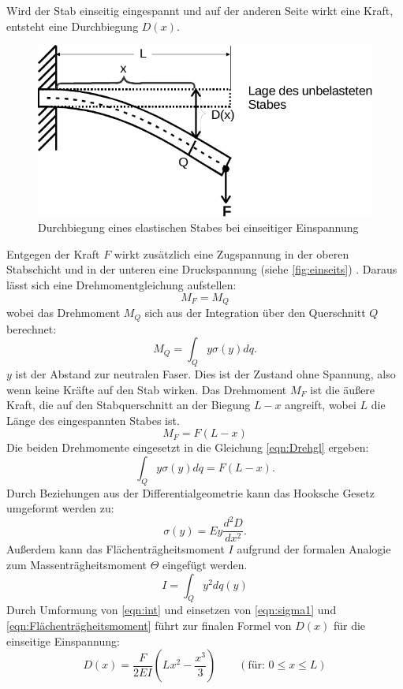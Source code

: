 Wird der Stab einseitig eingespannt und auf der anderen Seite wirkt eine Kraft, entsteht eine Durchbiegung $D(x)$.
\begin{figure}
  \centering
  \includegraphics{content/einseitig.pdf}
  \caption{Durchbiegung eines elastischen Stabes bei einseitiger Einspannung \cite[107]{V103}}
  \label{fig:einseits}
\end{figure}
Entgegen der Kraft $F$ wirkt zusätzlich eine Zugspannung in der oberen Stabschicht und in der unteren eine Druckspannung (siehe \autoref{fig:einseits}) . 
Daraus lässt sich eine Drehmomentgleichung aufstellen:
\begin{equation}
    M_F = M_Q
\label{eqn:Drehgl}
\end{equation}
wobei das Drehmoment $M_Q$ sich aus der Integration über den Querschnitt $Q$ berechnet:
\begin{equation}
    M_Q = \int_Q y \sigma(y) dq.
    \label{eqn:M_Q}
\end{equation}
$y$ ist der Abstand zur neutralen Faser. Dies ist der Zustand ohne Spannung, also wenn keine Kräfte auf den Stab wirken.
Das Drehmoment $M_F$ ist die äußere Kraft, die auf den Stabquerschnitt an der Biegung $L-x$ angreift, 
wobei $L$ die Länge des eingespannten Stabes ist.
\begin{equation}
    M_F = F(L-x)
    \label{eqn:M_F}
\end{equation}
Die beiden Drehmomente eingesetzt in die Gleichung \autoref{eqn:Drehgl} ergeben:
\begin{equation}
  \int_Q y \sigma(y) dq = F(L-x).\label{eqn:int}
\end{equation}
Durch Beziehungen aus der Differentialgeometrie kann das Hooksche Gesetz umgeformt werden zu:
\begin{equation}
   \sigma(y) = E y \frac{d^2D}{dx^2}.\label{eqn:sigma1}
\end{equation}
Außerdem kann das Flächenträgheitsmoment $I$ aufgrund der formalen Analogie zum Massenträgheitsmoment $\Theta$ eingefügt werden. \cite[109]{V103}
\begin{equation}
   I = \int_Q y^2dq(y)
   \label{eqn:Flächenträgheitsmoment}
\end{equation}
Durch Umformung von \autoref{eqn:int} und einsetzen von \autoref{eqn:sigma1} und \autoref{eqn:Flächenträgheitsmoment} führt zur finalen Formel von $D(x)$ für die einseitige Einspannung:
\begin{equation}
  D(x) = \frac{F}{2 E I}(Lx^2 - \frac{x^3}{3}) \qquad (\text{für: } 0 \leq x \leq L)
  \label{eqn:Biegung}
\end{equation}

